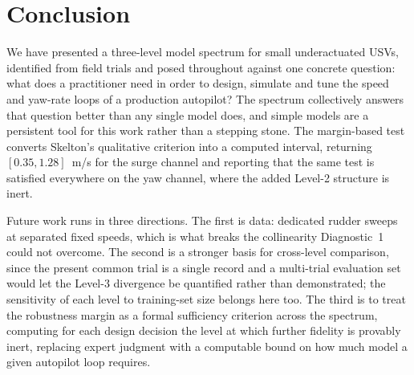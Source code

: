 \documentclass[conference]{IEEEtran}
\begin{document}
\section{Conclusion}
\label{sec:conclusion}

We have presented a three-level model spectrum for small underactuated USVs, identified from field trials and posed throughout against one concrete question: what does a practitioner need in order to design, simulate and tune the speed and yaw-rate loops of a production autopilot? The spectrum collectively answers that question better than any single model does, and simple models are a persistent tool for this work rather than a stepping stone. The margin-based test converts Skelton's qualitative criterion into a computed interval, returning $[0.35, 1.28]$~m/s for the surge channel and reporting that the same test is satisfied everywhere on the yaw channel, where the added Level-2 structure is inert.

Future work runs in three directions. The first is data: dedicated rudder sweeps at separated fixed speeds, which is what breaks the collinearity Diagnostic~1 could not overcome. The second is a stronger basis for cross-level comparison, since the present common trial is a single record and a multi-trial evaluation set would let the Level-3 divergence be quantified rather than demonstrated; the sensitivity of each level to training-set size belongs here too. The third is to treat the robustness margin as a formal sufficiency criterion across the spectrum, computing for each design decision the level at which further fidelity is provably inert, replacing expert judgment with a computable bound on how much model a given autopilot loop requires.



\end{document}
